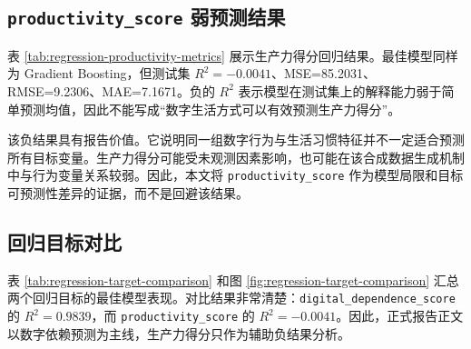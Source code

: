 \subsection{\texttt{productivity\_score} 弱预测结果}

表 \ref{tab:regression-productivity-metrics} 展示生产力得分回归结果。最佳模型同样为 Gradient Boosting，但测试集 $R^2=-0.0041$、MSE=85.2031、RMSE=9.2306、MAE=7.1671。负的 $R^2$ 表示模型在测试集上的解释能力弱于简单预测均值，因此不能写成“数字生活方式可以有效预测生产力得分”。



该负结果具有报告价值。它说明同一组数字行为与生活习惯特征并不一定适合预测所有目标变量。生产力得分可能受未观测因素影响，也可能在该合成数据生成机制中与行为变量关系较弱。因此，本文将 \texttt{productivity\_score} 作为模型局限和目标可预测性差异的证据，而不是回避该结果。

\subsection{回归目标对比}

表 \ref{tab:regression-target-comparison} 和图 \ref{fig:regression-target-comparison} 汇总两个回归目标的最佳模型表现。对比结果非常清楚：\texttt{digital\_dependence\_score} 的 $R^2=0.9839$，而 \texttt{productivity\_score} 的 $R^2=-0.0041$。因此，正式报告正文以数字依赖预测为主线，生产力得分只作为辅助负结果分析。



